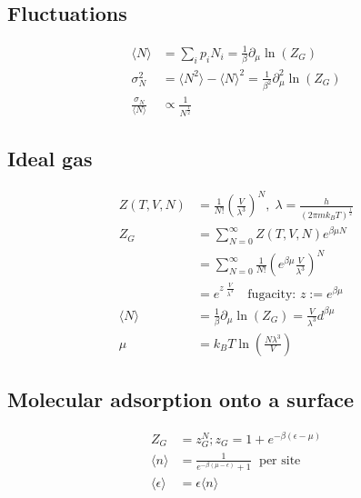 \subsection*{Fluctuations}
\begin{equation*}
    \begin{aligned}
        \langle N \rangle &= \sum_i p_i N_i = \frac{1}{\beta} \partial_\mu \ln(Z_G) \\
        \sigma_N^2 &= \langle N^2 \rangle - \langle N \rangle^2 = \frac{1}{\beta^2} \partial_\mu^2 \ln(Z_G) \\
        \frac{\sigma_N}{\langle N \rangle} & \propto \frac{1}{N^{\frac{1}{2}}}
    \end{aligned}
\end{equation*}

\subsection*{Ideal gas}

\begin{equation*}
    \begin{aligned}
        Z(T,V,N) &= \frac{1}{N!} \left(\frac{V}{\lambda^3}\right)^N , \; \lambda = \frac{h}{(2 \pi m k_B T)^\frac{1}{2}} \\
        Z_G &= \sum_{N=0}^\infty Z(T,V,N)e^{\beta \mu N} \\
            &= \sum_{N=0}^\infty \frac{1}{N!}\left(e^{\beta \mu} \frac{V}{\lambda^3}\right)^N \\
            &= e^{z \; \frac{V}{\lambda^3}} \quad \text{fugacity: } z:= e^{\beta \mu} \\
        \langle N \rangle &= \frac{1}{\beta} \partial_\mu \ln (Z_G) = \frac{V}{\lambda^3} d^{\beta \mu} \\
        \mu &= k_B T \ln \left(\frac{N \lambda^3}{V}\right)
    \end{aligned}
\end{equation*}

\subsection*{Molecular adsorption onto a surface}

\begin{equation*}
    \begin{aligned}
        Z_G &= z_G^N; z_G = 1+ e^{-\beta(\epsilon -\mu)} \\
        \langle n \rangle &= \frac{1}{e^{-\beta(\mu-\epsilon)}+1} \; \text{ per site} \\
        \langle \epsilon \rangle &= \epsilon \langle n \rangle
    \end{aligned}
\end{equation*}